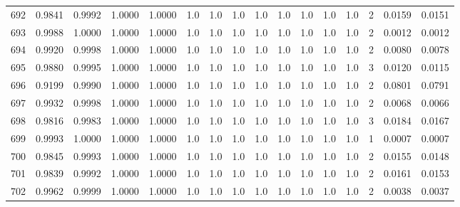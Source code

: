 \begin{tabular}{lrrrrrrrrrrrrrrr}
692 &      0.9841 &  0.9992 &  1.0000 &  1.0000 &     1.0 &     1.0 &     1.0 &     1.0 &     1.0 &     1.0 &      1.0 &        1.0 &      2 &                    0.0159 &                     0.0151 \\
693 &      0.9988 &  1.0000 &  1.0000 &  1.0000 &     1.0 &     1.0 &     1.0 &     1.0 &     1.0 &     1.0 &      1.0 &        1.0 &      2 &                    0.0012 &                     0.0012 \\
694 &      0.9920 &  0.9998 &  1.0000 &  1.0000 &     1.0 &     1.0 &     1.0 &     1.0 &     1.0 &     1.0 &      1.0 &        1.0 &      2 &                    0.0080 &                     0.0078 \\
695 &      0.9880 &  0.9995 &  1.0000 &  1.0000 &     1.0 &     1.0 &     1.0 &     1.0 &     1.0 &     1.0 &      1.0 &        1.0 &      3 &                    0.0120 &                     0.0115 \\
696 &      0.9199 &  0.9990 &  1.0000 &  1.0000 &     1.0 &     1.0 &     1.0 &     1.0 &     1.0 &     1.0 &      1.0 &        1.0 &      2 &                    0.0801 &                     0.0791 \\
697 &      0.9932 &  0.9998 &  1.0000 &  1.0000 &     1.0 &     1.0 &     1.0 &     1.0 &     1.0 &     1.0 &      1.0 &        1.0 &      2 &                    0.0068 &                     0.0066 \\
698 &      0.9816 &  0.9983 &  1.0000 &  1.0000 &     1.0 &     1.0 &     1.0 &     1.0 &     1.0 &     1.0 &      1.0 &        1.0 &      3 &                    0.0184 &                     0.0167 \\
699 &      0.9993 &  1.0000 &  1.0000 &  1.0000 &     1.0 &     1.0 &     1.0 &     1.0 &     1.0 &     1.0 &      1.0 &        1.0 &      1 &                    0.0007 &                     0.0007 \\
700 &      0.9845 &  0.9993 &  1.0000 &  1.0000 &     1.0 &     1.0 &     1.0 &     1.0 &     1.0 &     1.0 &      1.0 &        1.0 &      2 &                    0.0155 &                     0.0148 \\
701 &      0.9839 &  0.9992 &  1.0000 &  1.0000 &     1.0 &     1.0 &     1.0 &     1.0 &     1.0 &     1.0 &      1.0 &        1.0 &      2 &                    0.0161 &                     0.0153 \\
702 &      0.9962 &  0.9999 &  1.0000 &  1.0000 &     1.0 &     1.0 &     1.0 &     1.0 &     1.0 &     1.0 &      1.0 &        1.0 &      2 &                    0.0038 &                     0.0037 \\

\end{tabular}
